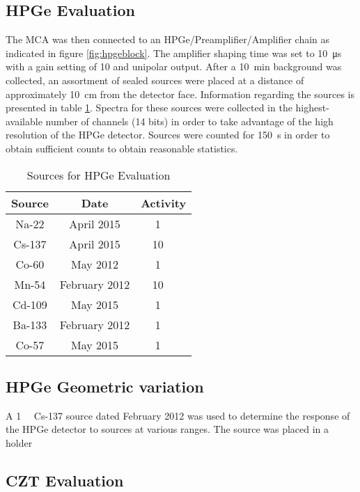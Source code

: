 \documentclass[12pt]{article}
\begin{document}
\subsection{HPGe Evaluation}
The MCA was then connected to an HPGe/Preamplifier/Amplifier chain as indicated in figure \ref{fig:hpgeblock}. The amplifier shaping time was set to \SI{10}{\micro\second} with a gain setting of 10 and unipolar output. After a \SI{10}{\minute} background was collected, an assortment of sealed sources were placed at a distance of approximately \SI{10}{\centi\meter} from the detector face. Information regarding the sources is presented in table \ref{tab:hpgesources}. Spectra for these sources were collected in the highest-available number of channels (14 bits) in order to take advantage of the high resolution of the HPGe detector. Sources were counted for \SI{150}{\second} in order to obtain sufficient counts to obtain reasonable statistics.

\begin{center}
\begin{table}
	\centering
	\begin{tabular}{c c c}
		\hline\hline
		Source & Date & Activity \\
		\hline
		Na-22 & April 2015 & \SI{1}{\micro\curie} \\
		Cs-137 & April 2015 & \SI{10}{\micro\curie} \\
		Co-60 & May 2012 & \SI{1}{\micro\curie} \\
		Mn-54 & February 2012 & \SI{10}{\micro\curie} \\
		Cd-109 & May 2015 & \SI{1}{\micro\curie} \\
		Ba-133 & February 2012 & \SI{1}{\micro\curie} \\
		Co-57 & May 2015 & \SI{1}{\micro\curie} \\
		\hline
	\end{tabular}
	\caption{Sources for HPGe Evaluation\label{tab:hpgesources}}
\end{table}
\end{center}

\subsection{HPGe Geometric variation}
A \SI{1}{\micro\curie} Cs-137 source dated February 2012 was used to determine the response of the HPGe detector to sources at various ranges. The source was placed in a holder 

\subsection{CZT Evaluation}
\end{document}

